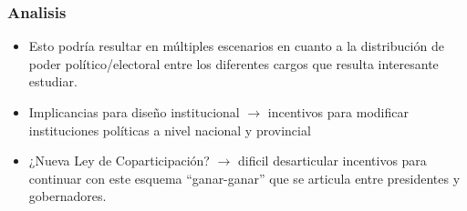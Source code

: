 \documentclass[a4paper,handout,mathserif,final,xcolor=dvipsnames,twocolumn]{beamer}
\begin{document}
\begin{frame}\frametitle{Analisis}
  \begin{itemize}\itemsep 10pt
                  \item Esto podría resultar en múltiples escenarios
                    en cuanto a la distribución de poder
                    político/electoral entre los diferentes cargos que
                    resulta interesante estudiar.
                    \item Implicancias para diseño institucional
                      $\longrightarrow$ incentivos para modificar
                      instituciones políticas a nivel nacional y
                      provincial
                      \item ¿Nueva Ley de Coparticipación?
                        $\longrightarrow$ dificil desarticular
                        incentivos para continuar con este esquema
                        ``ganar-ganar'' que se articula entre
                        presidentes y gobernadores. 
                  \end{itemize}
                \end{frame}
\end{document}
